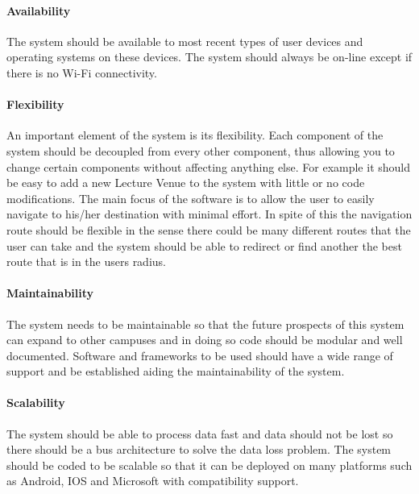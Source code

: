\documentclass[runningheads,a4paper]{llncs}
\begin{document}
\paragraph{Availability \\}
 The system should be available to most recent types of user devices and operating systems on these devices. The system should always be on-line except if there is no Wi-Fi connectivity.

\paragraph{Flexibility \\}
 An important element of the system is its flexibility. 
 Each component of the system should be decoupled from every other component, thus allowing you to change certain components without affecting anything else. 
 For example it should be easy to add a new Lecture Venue to the system with little or no code modifications. 
 The main focus of the software is to allow the user to easily navigate to his/her destination with minimal effort.
 In spite of this the navigation route should be flexible in the sense there could be many different routes that the user can take and the system should be able to redirect or find another the best route that is in the users radius.

\paragraph{Maintainability \\}
 The system needs to be maintainable so that the future prospects of this system can expand to other campuses and in doing so code should be modular and well documented. Software and frameworks to be used should have a wide range of support and be established aiding the maintainability of the system.

\paragraph{Scalability \\}
 The system should be able to process data fast and data should not be lost so there should be a bus architecture to solve the data loss problem. The system should be coded to be scalable so that it can be deployed on many platforms such as Android, IOS and Microsoft with compatibility support.
\end{document}

